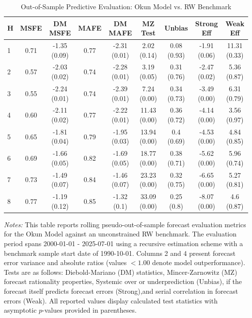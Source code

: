 \begin{table}[htbp]
\centering
\caption{Out-of-Sample Predictive Evaluation: Okun Model vs. RW Benchmark}
\label{tab:okun_model_evaluation}
\footnotesize
\begin{tabular}{l cccccccc}
\hline\hline
\rule{0pt}{3ex}
\textbf{H} & \textbf{MSFE} & \textbf{DM MSFE} & \textbf{MAFE} & \textbf{DM MAFE} & \textbf{MZ Test} & \textbf{Unbias} & \textbf{Strong Eff} & \textbf{Weak Eff} \\[0.5ex]
\hline
\rule{0pt}{2.5ex}
1 & 0.71 & -1.35 (0.09) & 0.77 & -2.31 (0.01) & 2.02 (0.14) & 0.08 (0.93) & -1.91 (0.06) & 11.31 (0.33) \\
2 & 0.57 & -2.03 (0.02) & 0.74 & -2.28 (0.01) & 3.19 (0.05) & 0.31 (0.76) & -2.47 (0.02) & 5.36 (0.87) \\
3 & 0.55 & -2.24 (0.01) & 0.74 & -2.39 (0.01) & 7.24 (0.00) & 0.34 (0.73) & -3.49 (0.00) & 6.31 (0.79) \\
4 & 0.60 & -2.11 (0.02) & 0.77 & -2.22 (0.01) & 11.43 (0.00) & 0.36 (0.72) & -4.14 (0.00) & 3.56 (0.97) \\
5 & 0.65 & -1.81 (0.04) & 0.79 & -1.95 (0.03) & 13.94 (0.00) & 0.4 (0.69) & -4.53 (0.00) & 4.84 (0.85) \\
6 & 0.69 & -1.66 (0.05) & 0.82 & -1.69 (0.05) & 18.77 (0.00) & 0.38 (0.71) & -5.62 (0.00) & 5.96 (0.74) \\
7 & 0.73 & -1.49 (0.07) & 0.84 & -1.46 (0.07) & 23.23 (0.00) & 0.32 (0.75) & -6.65 (0.00) & 5.27 (0.81) \\
8 & 0.77 & -1.19 (0.12) & 0.85 & -1.32 (0.1) & 33.09 (0.00) & 0.25 (0.8) & -8.07 (0.00) & 4.6 (0.87) \\
\hline\hline
\end{tabular}%
\par\smallskip
\parbox{\textwidth}{\scriptsize \textit{Notes:} This table reports rolling pseudo-out-of-sample forecast evaluation metrics for the Okun Model against an unconstrained RW benchmark. The evaluation period spans 2000-01-01 - 2025-07-01 using a recursive estimation scheme with a benchmark sample start date of 1990-10-01. Columns 2 and 4 present forecast error variance and absolute ratios (values $< 1.00$ denote model outperformance). Tests are as follows: Diebold-Mariano (DM) statistics, Mincer-Zarnowitz (MZ) forecast rationality properties, Systemic over or underprediction (Unbias), if the forecast itself predicts forecast errors (Strong),and serial correlation in forecast errors (Weak). All reported values display calculated test statistics with asymptotic $p$-values provided in parentheses.}
\end{table}
